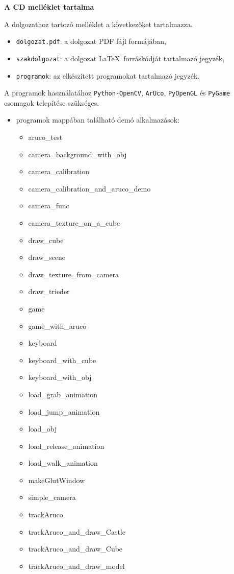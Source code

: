\pagestyle{empty}

\noindent \textbf{\Large A CD melléklet tartalma}

\vskip 1cm

\noindent A dolgozathoz tartozó melléklet a következőket tartalmazza.

\begin{itemize}
\item \texttt{dolgozat.pdf}: a dolgozat PDF fájl formájában,
\item \texttt{szakdolgozat}: a dolgozat \LaTeX\ forráskódját tartalmazó jegyzék,
\item \texttt{programok}: az elkészített programokat tartalmazó jegyzék.
\end{itemize}
A programok használatához \texttt{Python-OpenCV}, \texttt{ArUco}, \texttt{PyOpenGL} és \texttt{PyGame} csomagok telepítése szükséges.

\begin{itemize}
\item programok mappában található demó alkalmazások:
\begin{itemize}
\item aruco\_test
\item camera\_background\_with\_obj
\item camera\_calibration
\item camera\_calibration\_and\_aruco\_demo
\item camera\_func
\item camera\_texture\_on\_a\_cube
\item draw\_cube
\item draw\_scene
\item draw\_texture\_from\_camera
\item draw\_trieder
\item game
\item game\_with\_aruco
\item keyboard
\item keyboard\_with\_cube
\item keyboard\_with\_obj
\item load\_grab\_animation
\item load\_jump\_animation
\item load\_obj
\item load\_release\_animation
\item load\_walk\_animation
\item makeGlutWindow
\item simple\_camera
\item trackAruco
\item trackAruco\_and\_draw\_Castle
\item trackAruco\_and\_draw\_Cube
\item trackAruco\_and\_draw\_model
\end{itemize}
\end{itemize}